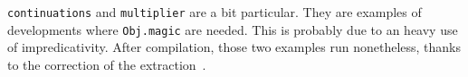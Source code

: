 {\tt continuations} and {\tt multiplier} are a bit particular. They are
examples of developments where {\tt Obj.magic} are needed.  This is
probably due to an heavy use of impredicativity. After compilation, those
two examples run nonetheless, thanks to the correction of the
extraction~\cite{Let02}.

